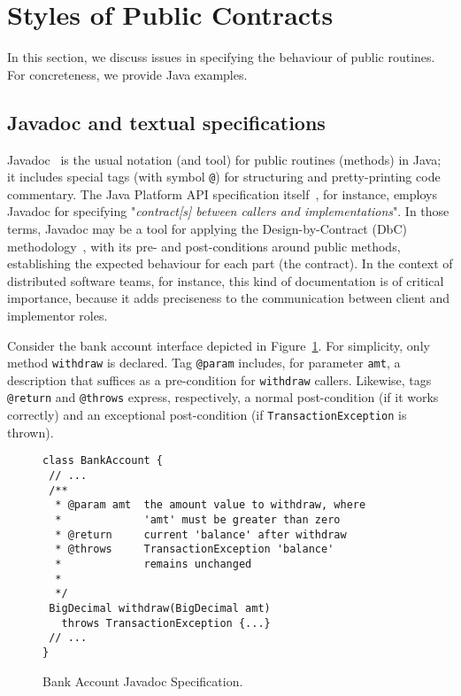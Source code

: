 \section{Styles of Public Contracts}
\label{sec:example}

In this section, we discuss issues in specifying the behaviour of public routines. For concreteness, we provide Java examples.

\subsection{Javadoc and textual specifications}

Javadoc~\cite{javadoc-oracle} is the usual notation (and tool) for public routines (methods) in Java; it includes special tags (with symbol \texttt{@}) for structuring and pretty-printing code commentary.
The Java Platform API specification itself~\cite{java-spec}, for instance, employs Javadoc for specifying "\emph{contract[s] between callers and implementations}". In those terms, Javadoc may be a tool for applying the Design-by-Contract (DbC) methodology~\cite{dbc}, with its pre- and post-conditions around public methods, establishing the expected behaviour for each part (the contract). In the context of distributed software teams, for instance, this kind of documentation is of critical importance, because it adds preciseness to the communication between client and implementor roles. 


Consider the bank account interface depicted in Figure~\ref{Fig-Javadoc-Bank}. For simplicity, only method {\lstinline!withdraw!} is declared. Tag \lstinline!@param! includes, for parameter \lstinline!amt!, a description that suffices as a pre-condition for \lstinline!withdraw! callers. Likewise, tags \lstinline!@return! and \lstinline!@throws! express, respectively, a normal post-condition (if it works correctly) and an exceptional post-condition (if \lstinline!TransactionException! is thrown).


\begin{figure}
\centering
\begin{lstlisting}[basicstyle=\footnotesize\ttfamily,name=figxpi]
class BankAccount {
 // ...
 /**
  * @param amt  the amount value to withdraw, where
  *             'amt' must be greater than zero 
  * @return     current 'balance' after withdraw
  * @throws     TransactionException 'balance' 
  *             remains unchanged
  *
  */
 BigDecimal withdraw(BigDecimal amt) 
   throws TransactionException {...}
 // ...
}
\end{lstlisting}
\caption{Bank Account Javadoc Specification.}
\label{Fig-Javadoc-Bank}
\end{figure}



